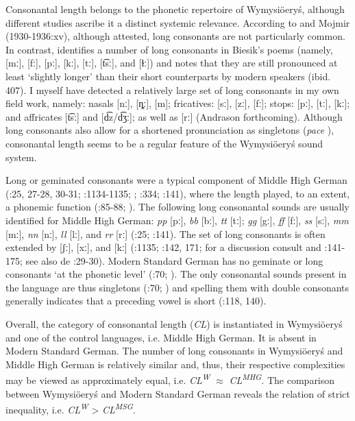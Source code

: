 \documentclass[output=paper]{langscibook}
\begin{document}
Consonantal length belongs to the phonetic repertoire of Wymysiöeryś, although different studies ascribe it a distinct systemic relevance. According to \citet[15]{Kleczkowski1920} and Mojmir (1930-1936:xv), although attested, long consonants are not particularly common. In contrast, \citet[405-407]{Wicherkiewicz2003} identifies a number of long consonants in Biesik’s poems (namely, [mː], [fː], [pː], [kː], [tː], [t͡sː], and [ɫː]) and notes that they are still pronounced at least ‘slightly longer’ than their short counterparts by modern speakers (ibid. 407). I myself have detected a relatively large set of long consonants in my own field work, namely: nasals [nː], [ȵː], [m]; fricatives: [sː], [zː], [fː]; stops: [pː], [tː], [kː]; and affricates [t͡sː] and [d͡z/d͡ʒː]; as well as [rː] (Andrason forthcoming). Although long consonants also allow for a shortened pronunciation as singletons (\textit{pace} \citealt{Kleczkowski1920}), consonantal length seems to be a regular feature of the Wymysiöeryś sound system.

Long or geminated consonants were a typical component of Middle High German (\citealt{Wright1917}:25, 27-28, 30-31; \citealt{Simmler1985}:1134-1135; \citealt{Goblirsch1997,20181997}; \citealt{Jessen1998}:334; \citealt{Paul2007}:141), where the length played, to an extent, a phonemic function (\citealt{Fourquet1963}:85-88; \citealt{MoosmüllerBrandstätter2015}). The following long consonantal sounds are usually identified for Middle High German: \textit{pp} [pː], \textit{bb} [bː], \textit{tt} [tː]; \textit{gg} [gː], \textit{ff} [fː], \textit{ss} [sː], \textit{mm} [mː], \textit{nn} [nː], \textit{ll} [lː], and \textit{rr} [rː] (\citealt{Wright1917}:25; \citealt{Paul2007}:141). The set of long consonants is often extended by [ʃː], [xː], and [kː] (\citealt{Simmler1985}:1135; \citealt{Paul2007}:142, 171; for a discussion consult \citealt{Goblirsch1997,20181997} and \citealt{Paul2007}:141-175; see also de \citealt{BoorWisniewski1973}:29-30). Modern Standard German has no geminate or long consonants ‘at the phonetic level’ (\citealt{Caratini2007}:70; \citealt{Goblirsch2018}). The only consonantal sounds present in the language are thus singletons (\citealt{Caratini2007}:70; \citealt{Fagan2009}) and spelling them with double consonants generally indicates that a preceding vowel is short (\citealt{Russ1994}:118, 140).

Overall, the category of consonantal length (\textit{CL}) is instantiated in Wymysiöeryś and one of the control languages, i.e. Middle High German. It is absent in Modern Standard German. The number of long consonants in Wymysiöeryś and Middle High German is relatively similar and, thus, their respective complexities may be viewed as approximately equal, i.e. \textit{CL\textsuperscript{W}} ${\approx}$ \textit{CL\textsuperscript{MHG}}. The comparison between Wymysiöeryś and Modern Standard German reveals the relation of strict inequality, i.e. \textit{CL\textsuperscript{W}} > \textit{CL\textsuperscript{MSG}}.
\end{document}
